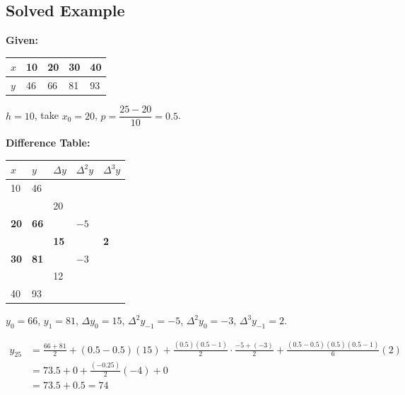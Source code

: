 \documentclass[12pt]{article}
\newcommand{\hcell}[1]{\textbf{\color{white}#1}}
\begin{document}
\subsection*{Solved Example}

\begin{examplebox*}
\textbf{Given:}
\begin{center}
\begin{tabular}{C{1.4cm} C{1.4cm} C{1.4cm} C{1.4cm} C{1.4cm}}
\toprule
{}
\hcell{$x$} & \hcell{10} & \hcell{20} & \hcell{30} & \hcell{40} \\
\midrule
$y$ & 46 & 66 & 81 & 93 \\
\bottomrule
\end{tabular}
\end{center}

$h=10$,\; take $x_0=20$,\; $p = \dfrac{25-20}{10} = 0.5$.

\medskip\textbf{Difference Table:}
\begin{center}
\renewcommand{\arraystretch}{1.3}
\begin{tabular}{C{1.2cm} C{1.2cm} C{1.4cm} C{1.4cm} C{1.4cm}}
\toprule
{}
\hcell{$x$} & \hcell{$y$} & \hcell{$\Delta y$} & \hcell{$\Delta^2 y$} & \hcell{$\Delta^3 y$} \\
 & 46 & & & \\
 & & 20 & & \\
\textbf{20} & \textbf{66} & & $-5$ & \\
 & & \textbf{15} & & \textbf{2} \\
\textbf{30} & \textbf{81} & & $-3$ & \\
 & & 12 & & \\
40 & 93 & & & \\
\bottomrule
\end{tabular}
\end{center}

$y_0=66$,\; $y_1=81$,\; $\Delta y_0=15$,\; $\Delta^2 y_{-1}=-5$,\; $\Delta^2 y_0=-3$,\; $\Delta^3 y_{-1}=2$.

\begin{align*}
y_{25} &= \frac{66+81}{2} + \!\left(0.5-0.5\right)(15)
+ \frac{(0.5)(0.5-1)}{2}\cdot\frac{-5+(-3)}{2}
+ \frac{(0.5-0.5)(0.5)(0.5-1)}{6}(2) \\[4pt]
&= 73.5 + 0 + \frac{(-0.25)}{2}(-4) + 0 \\[4pt]
&= 73.5 + 0.5 = \boxed{74}
\end{align*}
\end{examplebox*}
\end{document}
